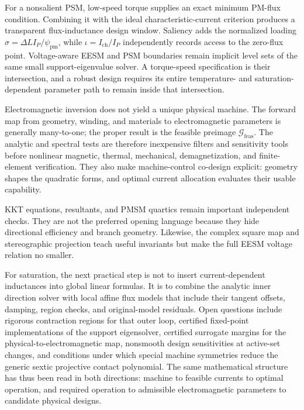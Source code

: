 For a nonsalient PSM, low-speed torque supplies an exact minimum PM-flux
condition. Combining it with the ideal characteristic-current criterion
produces a transparent flux-inductance design window. Saliency adds the
normalized loading \(\sigma=\Delta L I_P/\psi_{\mathrm{pm}}\), while
\(\iota=I_{\mathrm{ch}}/I_P\) independently records access to the zero-flux
point. Voltage-aware EESM and PSM boundaries remain implicit level sets of the
same small support-eigenvalue solver. A torque-speed specification is their
intersection, and a robust design requires its entire temperature- and
saturation-dependent parameter path to remain inside that intersection.

Electromagnetic inversion does not yield a unique physical machine. The
forward map from geometry, winding, and materials to electromagnetic
parameters is generally many-to-one; the proper result is the feasible
preimage \(\mathcal G_{\mathrm{feas}}\). The analytic and spectral tests are
therefore inexpensive filters and sensitivity tools before nonlinear magnetic,
thermal, mechanical, demagnetization, and finite-element verification. They
also make machine-control co-design explicit: geometry shapes the quadratic
forms, and optimal current allocation evaluates their usable capability.

KKT equations, resultants, and PMSM quartics remain important independent
checks. They are not the preferred opening language because they hide
directional efficiency and branch geometry. Likewise, the complex square map
and stereographic projection teach useful invariants but make the full EESM
voltage relation no smaller.

For saturation, the next practical step is not to insert current-dependent
inductances into global linear formulas. It is to combine the analytic inner
direction solver with local affine flux models that include their tangent
offsets, damping, region checks, and original-model residuals. Open questions
include rigorous contraction regions for that outer loop, certified fixed-point
implementations of the support eigensolver, certified surrogate margins for
the physical-to-electromagnetic map, nonsmooth design sensitivities at
active-set changes, and conditions under which special machine symmetries
reduce the generic sextic projective contact polynomial. The same mathematical
structure has thus been read in both directions: machine to feasible currents
to optimal operation, and required operation to admissible electromagnetic
parameters to candidate physical designs.


